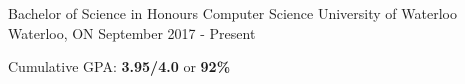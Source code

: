 
\begin{cventries}
  \cventry
    {Bachelor of Science in Honours Computer Science} %
    {University of Waterloo} %
    {Waterloo, ON} %
    {September 2017 - Present} %
    {
      \begin{cvitems} %
        \item {Cumulative GPA: \textbf{3.95/4.0} or \textbf{92\%}}
      \end{cvitems}
    }
\end{cventries}
